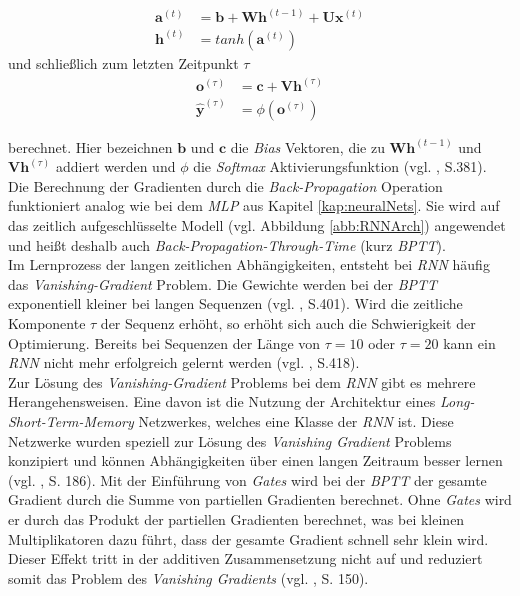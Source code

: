 \documentclass[a4paper,11pt]{article}
\begin{document}
\begin{align*}
    \bm{a}^{(t)} &= \bm{b} + \bm{W} \bm{h}^{(t-1)} + \bm{U}\bm{x}^{(t)} \\
    \bm{h}^{(t)} &= tanh(\bm{a}^{(t)}) 
\end{align*}
    und schließlich zum letzten Zeitpunkt $\tau$
\begin{align*}
    \bm{o}^{(\tau)} &= \bm{c} + \bm{V}\bm{h}^{(\tau)} \\
    \bm{\hat{y}}^{(\tau)} &= \phi(\bm{o}^{(\tau)})
\end{align*}

berechnet. Hier bezeichnen $\bm{b}$ und $\bm{c}$ die \textit{Bias} Vektoren, die zu $\bm{W} \bm{h}^{(t-1)} $ und $\bm{V}\bm{h}^{(\tau)} $ addiert werden und $\phi$ die \textit{Softmax} Aktivierungsfunktion (vgl. \cite{deepL}, S.381).\\ 
Die Berechnung der Gradienten durch die \textit{Back-Propagation} Operation funktioniert analog wie bei dem \textit{MLP} aus Kapitel \ref{kap:neuralNets}. Sie wird auf das zeitlich aufgeschlüsselte Modell (vgl. Abbildung \ref{abb:RNNArch}) angewendet und heißt deshalb auch \textit{Back-Propagation-Through-Time} (kurz \textit{BPTT}). \\
Im Lernprozess der langen zeitlichen Abhängigkeiten, entsteht bei \textit{RNN} häufig das \textit{Vanishing-Gradient} Problem.
Die Gewichte werden bei der \textit{BPTT} exponentiell kleiner bei langen Sequenzen (vgl. \cite{deepL}, S.401). Wird die zeitliche Komponente $\tau$ der Sequenz erhöht, so erhöht sich auch die Schwierigkeit der Optimierung.
Bereits bei Sequenzen der Länge von $\tau = 10$ oder $\tau = 20$ kann ein \textit{RNN} nicht mehr erfolgreich gelernt werden (vgl. \cite{deepL}, S.418).\\

Zur Lösung des \textit{Vanishing-Gradient} Problems bei dem \textit{RNN} gibt es mehrere Herangehensweisen. Eine davon ist die Nutzung der Architektur eines \textit{Long-Short-Term-Memory} Netzwerkes, welches eine Klasse der \textit{RNN} ist. Diese Netzwerke wurden speziell zur Lösung des \textit{Vanishing Gradient} Problems konzipiert und können Abhängigkeiten über einen langen Zeitraum besser lernen (vgl. \cite{keras}, S. 186). Mit der Einführung von \textit{Gates} wird bei der \textit{BPTT} der gesamte Gradient durch die Summe von partiellen Gradienten berechnet. Ohne \textit{Gates} wird er durch das Produkt der partiellen Gradienten berechnet, was bei kleinen Multiplikatoren dazu führt, dass der gesamte Gradient schnell sehr klein wird. Dieser Effekt tritt in der additiven Zusammensetzung nicht auf und reduziert somit das Problem des \textit{Vanishing Gradients} (vgl. \cite{deepEssentials}, S. 150).
\end{document}
